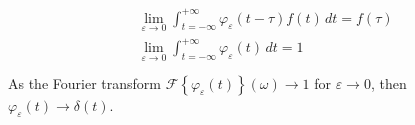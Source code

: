\documentclass[letterpaper,10pt,english]{jupyterBook}
\begin{document}
\begin{enumerate}
\begin{equation*}
\begin{split}\begin{aligned}
      & \lim_{\varepsilon \rightarrow 0} \int_{t = -\infty}^{+\infty} \varphi_{\varepsilon}(t- \tau) f(t) \, dt = f(\tau) \\
      & \lim_{\varepsilon \rightarrow 0} \int_{t = -\infty}^{+\infty} \varphi_{\varepsilon}(t) \, dt = 1 \\
    \end{aligned}\end{split}
\end{equation*}
\sphinxAtStartPar
As the Fourier transform \(\mathscr{F}\left\{\varphi_{\varepsilon}(t)\right\}(\omega) \rightarrow 1\) for \(\varepsilon \rightarrow 0\), then \(\varphi_{\varepsilon}(t) \rightarrow \delta(t)\).

\end{enumerate}
\end{document}
